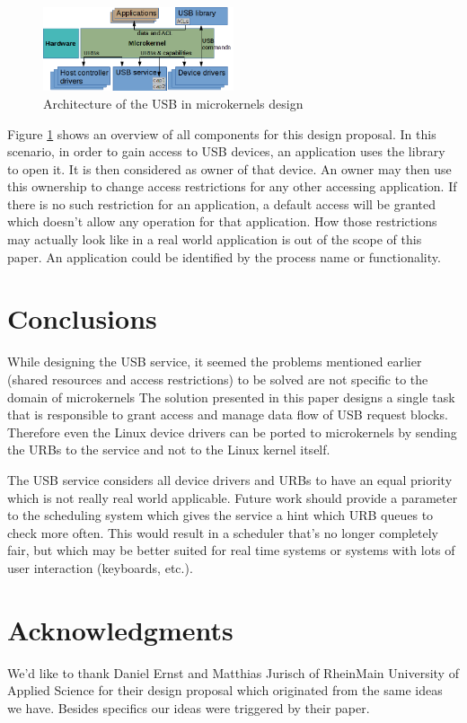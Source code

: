 \documentclass{acm_proc_article-sp}
\begin{document}
\begin{figure}[!h]
\centering
\includegraphics[width=0.5\textwidth]{usbarch.png}
\caption{Architecture of the USB in microkernels design}
\label{fig:usbarch}
\end{figure}
Figure \ref{fig:usbarch} shows an overview of all components for this design
proposal.
In this scenario, in order to gain access to USB devices, an application uses
the library to open it.
It is then considered as owner of that device.
An owner may then use this ownership to change access restrictions
for any other accessing application.
If there is no such restriction for an application, a default access will
be granted which doesn't allow any operation for that application.
How those restrictions may actually look like in a real world application
is out of the scope of this paper.
An application could be identified by the process name or functionality.

\section{Conclusions}
While designing the USB service, it seemed the problems mentioned earlier
(shared resources and access restrictions) to be solved are not specific
to the domain of microkernels
The solution presented in this paper designs a single task
that is responsible to grant access and manage data flow
of USB request blocks.
Therefore even the Linux device drivers can be ported
to microkernels by sending the URBs to the service and not to
the Linux kernel itself.

The USB service considers all device drivers and URBs to have
an equal priority which is not really real world applicable.
Future work should provide a parameter to the scheduling system
which gives the service a hint which URB queues to check
more often.
This would result in a scheduler that's no longer completely
fair, but which may be better suited for real time systems or
systems with lots of user interaction (keyboards, etc.).

\section{Acknowledgments}
We'd like to thank Daniel Ernst and Matthias Jurisch
of RheinMain University of Applied Science for their design proposal \cite{ernst}
which originated from the same ideas we have.
Besides specifics our ideas were triggered by their paper.

%


%
%
\end{document}
